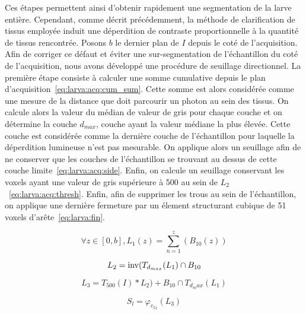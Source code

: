 \documentclass[\main/main.tex]{subfiles}
\begin{document}
%
Ces étapes permettent ainsi d'obtenir rapidement une segmentation de la larve entière.
%
Cependant, comme décrit précédemment,
la méthode de clarification de tissus employée induit une déperdition de contraste proportionnelle à la quantité de tissus rencontrée.
%
Posons $b$ le dernier plan de $I$ depuis le coté de l'acquisition.
%
Afin de corriger ce défaut et éviter une sur-segmentation de l'échantillon du coté de l'acquisition, nous avons développé une procédure de seuillage directionnel.
%
La première étape consiste à calculer une somme cumulative depuis le plan d'acquisition~\eqref{eq:larva:acq:cum_sum}.
%
Cette somme est alors considérée comme une mesure de la distance que doit parcourir un photon au sein des tissus.
%
On calcule alors la valeur du médian de valeur de gris pour chaque couche et on détermine la couche $d_{max}$, couche ayant la valeur médiane la plus élevée.
%
Cette couche est considérée comme la dernière couche de l'échantillon pour laquelle la déperdition lumineuse n'est pas mesurable.
%
On applique alors un seuillage afin de ne conserver que les couches de l'échantillon se trouvant au dessus de cette couche limite~\eqref{eq:larva:acq:side}.
%
Enfin, on calcule un seuillage conservant les voxels ayant une valeur de gris supérieure à 500 au sein de $L_2$~\eqref{eq:larva:acq:thresh}.
%
Enfin, afin de supprimer les trous au sein de l'échantillon, on applique une dernière fermeture par un élement structurant cubique de 51 voxels d'arête~\eqref{eq:larva:fin}.

\begin{equation}
    \label{eq:larva:acq:cum_sum}
        \forall z \in [0,b], L_1(z)=\sum_{n=1}^{z}(B_{10}(z))
\end{equation}

\begin{equation}
    \label{eq:larva:acq:side}
    L_2 = \operatorname{\textnormal{inv}}(T_{d_{max}}(L_1) \cap B_{10}
\end{equation}

\begin{equation}
    \label{eq:larva:acq:thresh}
    L_3 = T_{500}(I) * L_2) + B_{10} \cap T_{d_max}(L_1)
\end{equation}

\begin{equation}
    \label{eq:larva:fin}
    S_l = \varphi_{c_{51}}(L_3)
\end{equation}
\end{document}
